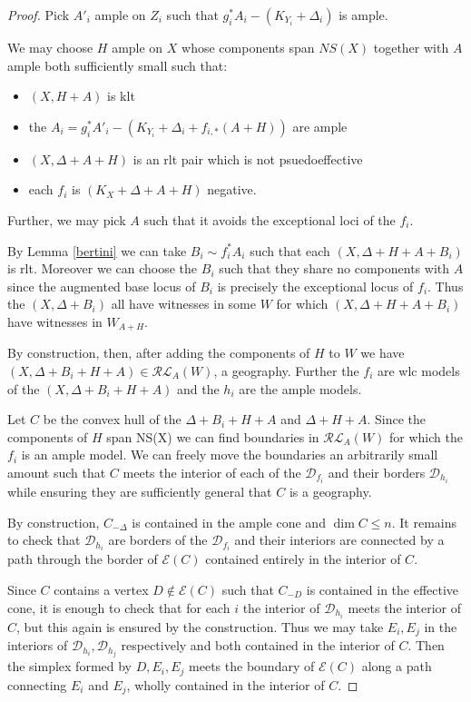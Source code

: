 \begin{proof}

	Pick $A'_{i}$ ample on $Z_{i}$ such that $g_{i}^{*}A_{i}-(K_{Y_{i}}+\Delta_{i})$ is ample. 
	
	We may choose $H$ ample on $X$ whose components span $NS(X)$ together with $A$ ample both sufficiently small such that:
	\begin{itemize}
		\item $(X,H+A)$ is klt
		\item the $A_{i} = g_{i}^{*}A'_{i}-(K_{Y_{i}}+\Delta_{i}+f_{i,*}(A+H))$ are ample
		\item $(X,\Delta+A+H)$ is an rlt pair which is not psuedoeffective
		\item each $f_{i}$ is $(K_{X}+\Delta+A+H)$ negative.
	\end{itemize}

	Further, we may pick $A$ such that it avoids the exceptional loci of the $f_{i}$.
	
	By Lemma \ref{bertini} we can take $B_{i} \sim f_{i}^{*}A_{i}$ such that each $(X,\Delta+H+A+B_{i})$ is rlt. Moreover we can choose the $B_{i}$ such that they share no components with $A$ since the augmented base locus of $B_{i}$ is precisely the exceptional locus of $f_{i}$. Thus the $(X,\Delta+B_{i})$ all have witnesses in some $W$ for which $(X,\Delta+H+A+B_{i})$ have witnesses in $W_{A+H}$.
	
	By construction, then, after adding the components of $H$ to $W$ we have $(X,\Delta+B_{i}+H+A) \in \mathcal{RL}_{A}(W)$, a geography. Further the $f_{i}$ are wlc models of the $(X,\Delta+B_{i}+H+A)$ and the $h_{i}$ are the ample models.
	
	Let $C$ be the convex hull of the $\Delta+B_{i}+H+A$ and $\Delta+H+A$. Since the components of $H$ span NS(X) we can find boundaries in $\mathcal{RL}_{A}(W)$ for which the $f_{i}$ is an ample model. We can freely move the boundaries an arbitrarily small amount such that $C$ meets the interior of each of the $\mathcal{D}_{f_{i}}$ and their borders $\mathcal{D}_{h_{i}}$ while ensuring they are sufficiently general that $C$ is a geography. 
	
	By construction, $C_{-\Delta}$ is contained in the ample cone and $\dim C \leq n$. It remains to check that $\mathcal{D}_{h_{i}}$ are borders of the $\mathcal{D}_{f_{i}}$ and their interiors are connected by a path through the border of $\mathcal{E}(C)$ contained entirely in the interior of $C$.
	
	Since $C$ contains a vertex $D \notin \mathcal{E}(C)$ such that $C_{-D}$ is contained in the effective cone, it is enough to check that for each $i$ the interior of $\mathcal{D}_{h_{i}}$ meets the interior of $C$, but this again is ensured by the construction. Thus we may take $E_{i},E_{j}$ in the interiors of $\mathcal{D}_{h_{i}},\mathcal{D}_{h_{j}}$ respectively and both contained in the interior of $C$. Then the simplex formed by $D,E_{i},E_{j}$ meets the boundary of $\mathcal{E}(C)$ along a path connecting $E_{i}$ and $E_{j}$, wholly contained in the interior of $C$.

\end{proof}
